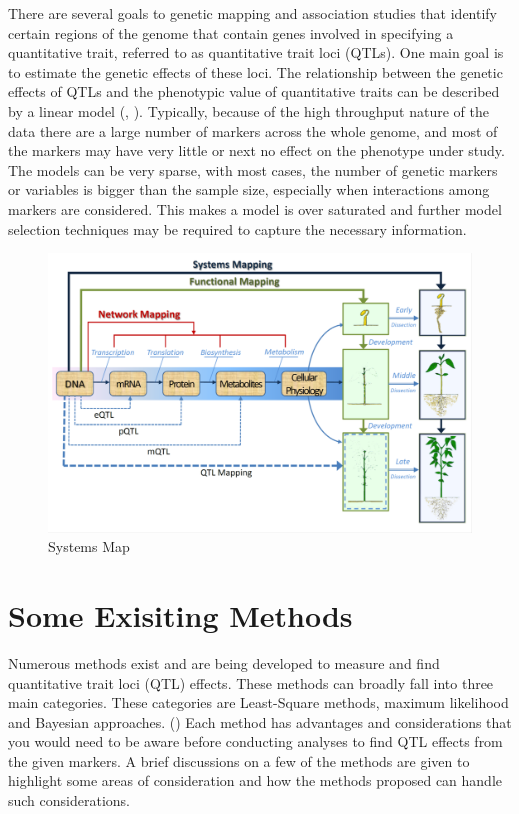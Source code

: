 \documentclass[11pt,]{book}
\theoremstyle{definition}
\theoremstyle{definition}
\theoremstyle{remark}
\begin{document}
There are several goals to genetic mapping and association studies that
identify certain regions of the genome that contain genes involved in
specifying a quantitative trait, referred to as quantitative trait loci
(QTLs). One main goal is to estimate the genetic effects of these loci.
The relationship between the genetic effects of QTLs and the phenotypic
value of quantitative traits can be described by a linear model
(\cite{collard2005introduction}, \cite{xu2007empirical}). Typically,
because of the high throughput nature of the data there are a large
number of markers across the whole genome, and most of the markers may
have very little or next no effect on the phenotype under study. The
models can be very sparse, with most cases, the number of genetic
markers or variables is bigger than the sample size, especially when
interactions among markers are considered. This makes a model is over
saturated and further model selection techniques may be required to
capture the necessary information. \cite{dong2015accurate}

\begin{figure}

{\centering \includegraphics[width=0.8\linewidth]{images/SystemsMapping} 

}

\caption{Systems Map}\label{fig:system-map}
\end{figure}

\section{Some Exisiting Methods}\label{some-exisiting-methods}

Numerous methods exist and are being developed to measure and find
quantitative trait loci (QTL) effects. These methods can broadly fall
into three main categories. These categories are Least-Square methods,
maximum likelihood and Bayesian approaches. (\cite{wu2007statistical})
Each method has advantages and considerations that you would need to be
aware before conducting analyses to find QTL effects from the given
markers. A brief discussions on a few of the methods are given to
highlight some areas of consideration and how the methods proposed can
handle such considerations.
\end{document}

